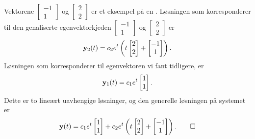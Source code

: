 \begin{ex}
Vektorene 
$
\begin{bmatrix}
-1  \\
1 
\end{bmatrix}
$
og 
$
\begin{bmatrix}
2  \\
2 
\end{bmatrix}
$
er et eksempel på en . 
Løsningen som korresponderer til den genaliserte egenvektorkjeden 
$
\begin{bmatrix}
-1  \\
1 
\end{bmatrix}
$
og 
$
\begin{bmatrix}
2  \\
2 
\end{bmatrix}
$
er 
\[
\mathbf{y}_2(t) = c_2 e^t
\left(
t
\begin{bmatrix}
2  \\
2 
\end{bmatrix}
+
\begin{bmatrix}
-1  \\
1 
\end{bmatrix}
\right).
\]
Løsningen som korresponderer til egenvektoren 
vi fant tidligere, er 
\[
\mathbf{y}_1(t) = c_1 e^t
\begin{bmatrix}
1  \\
1 
\end{bmatrix}.
\]
Dette er to lineært uavhengige løsninger, og den generelle løsningen på systemet er 
\[
\mathbf{y}(t) = c_1 e^t
\begin{bmatrix}
1  \\
1 
\end{bmatrix}
+ c_2 e^t
\left(
t
\begin{bmatrix}
2  \\
2 
\end{bmatrix}
+
\begin{bmatrix}
-1  \\
1 
\end{bmatrix}
\right).\qedhere
\]
\end{ex}

\kapittelslutt


